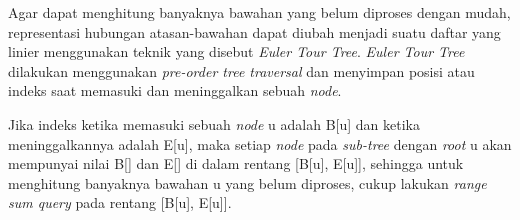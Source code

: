 \documentclass[../main_editorial.tex]{subfiles} %
\begin{document}
Agar dapat menghitung banyaknya bawahan yang belum diproses dengan mudah, representasi hubungan atasan-bawahan dapat diubah menjadi suatu daftar yang linier menggunakan teknik yang disebut \textit{Euler Tour Tree}. \textit{Euler Tour Tree} dilakukan menggunakan \textit{pre-order tree traversal} dan menyimpan posisi atau indeks saat memasuki dan meninggalkan sebuah \textit{node}.

Jika indeks ketika memasuki sebuah \textit{node} u adalah B[u] dan ketika meninggalkannya adalah E[u], maka setiap \textit{node} pada \textit{sub-tree} dengan \textit{root} u akan mempunyai nilai B[] dan E[] di dalam rentang [B[u], E[u]], sehingga untuk menghitung banyaknya bawahan u yang belum diproses, cukup lakukan \textit{range sum query} pada rentang [B[u], E[u]].
\end{document}

